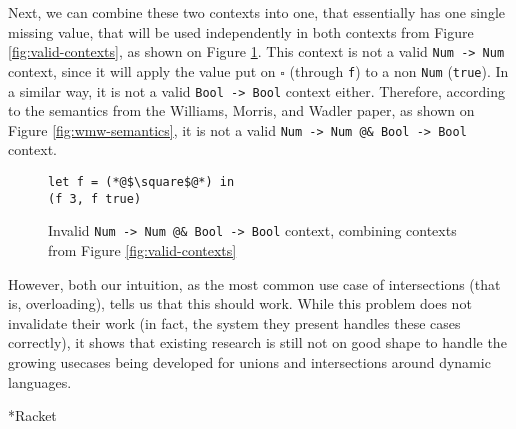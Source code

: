 \documentclass[sigplan,10pt,review,anonymous]{acmart}
\newcommand{\resolved}[2]{}
\newcommand{\nickel}[1]{\lstinline[language=nickel]{#1}}
\begin{document}
Next, we can combine these two contexts into one, that essentially
has one single missing value, that will be used independently in both contexts
from Figure \ref{fig:valid-contexts}, as shown on Figure \ref{fig:invalid-context}.
This context is not a valid \nickel{Num -> Num} context, since it will apply
the value put on $\square$ (through \nickel{f}) to a non \nickel{Num} (\nickel{true}).
In a similar way, it is not a valid \nickel{Bool -> Bool} context either.
Therefore, according to the semantics from the Williams, Morris, and Wadler paper, as
shown on Figure \ref{fig:wmw-semantics}, it is not a valid
\nickel{Num -> Num @& Bool -> Bool} context.

\begin{figure}[h]
\begin{lstlisting}[language=nickel]
let f = (*@$\square$@*) in
(f 3, f true) 
\end{lstlisting}
\caption{Invalid \nickel{Num -> Num @& Bool -> Bool} context,
combining contexts from Figure \ref{fig:valid-contexts}}
\label{fig:invalid-context}
\end{figure}

However, both our intuition, as the most common use case of intersections
(that is, overloading), tells us that this should work.
While this problem does not invalidate their work (in fact, the system they present
handles these cases correctly), it shows that existing research is still not on
good shape to handle the growing usecases being developed for
unions and intersections around dynamic languages.





\resolved{(Yann) Maybe adding a concrete example of this (it can be the same term but with
    concrete types like Number and String and simple contexts like application
    to a dumb argument) is sufficient to make the point}

\subsection*{Racket}
\label{sec:racket}
\end{document}
